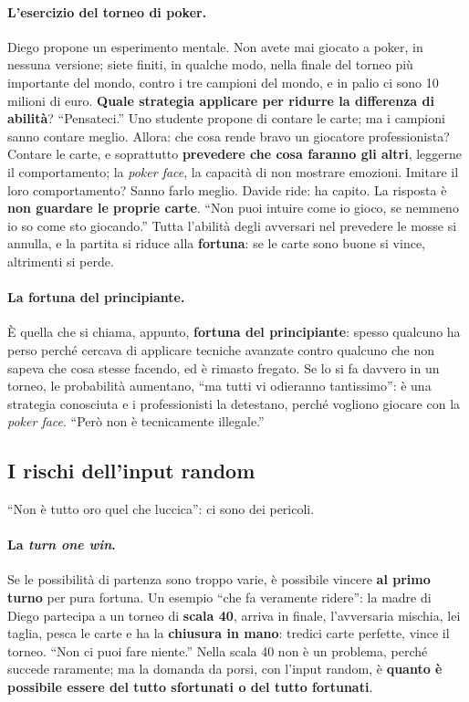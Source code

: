 \paragraph{L'esercizio del torneo di poker.} Diego propone un esperimento mentale. Non avete
mai giocato a poker, in nessuna versione; siete finiti, in qualche modo, nella finale del
torneo più importante del mondo, contro i tre campioni del mondo, e in palio ci sono 10
milioni di euro. \textbf{Quale strategia applicare per ridurre la differenza di abilità}?
``Pensateci.'' Uno studente propone di contare le carte; ma i campioni sanno contare meglio.
Allora: che cosa rende bravo un giocatore professionista? Contare le carte, e soprattutto
\textbf{prevedere che cosa faranno gli altri}, leggerne il comportamento; la \emph{poker
face}, la capacità di non mostrare emozioni. Imitare il loro comportamento? Sanno farlo
meglio. Davide ride: ha capito. La risposta è \textbf{non guardare le proprie carte}. ``Non
puoi intuire come io gioco, se nemmeno io so come sto giocando.'' Tutta l'abilità degli
avversari nel prevedere le mosse si annulla, e la partita si riduce alla \textbf{fortuna}: se
le carte sono buone si vince, altrimenti si perde.

\paragraph{La fortuna del principiante.} È quella che si chiama, appunto, \textbf{fortuna del
principiante}: spesso qualcuno ha perso perché cercava di applicare tecniche avanzate contro
qualcuno che non sapeva che cosa stesse facendo, ed è rimasto fregato. Se lo si fa davvero
in un torneo, le probabilità aumentano, ``ma tutti vi odieranno tantissimo'': è una strategia
conosciuta e i professionisti la detestano, perché vogliono giocare con la \emph{poker face}.
``Però non è tecnicamente illegale.''

\subsection{I rischi dell'input random}

``Non è tutto oro quel che luccica'': ci sono dei pericoli.

\paragraph{La \emph{turn one win}.} Se le possibilità di partenza sono troppo varie, è
possibile vincere \textbf{al primo turno} per pura fortuna. Un esempio ``che fa veramente
ridere'': la madre di Diego partecipa a un torneo di \textbf{scala 40}, arriva in finale,
l'avversaria mischia, lei taglia, pesca le carte e ha la \textbf{chiusura in mano}: tredici
carte perfette, vince il torneo. ``Non ci puoi fare niente.'' Nella scala 40 non è un
problema, perché succede raramente; ma la domanda da porsi, con l'input random, è
\textbf{quanto è possibile essere del tutto sfortunati o del tutto fortunati}.

